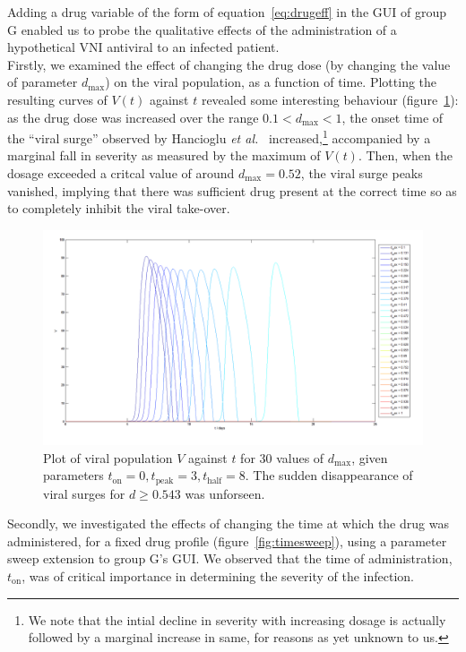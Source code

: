 \documentclass[a4paper, 12pt]{report}
\begin{document}
Adding a drug variable of the form of equation~\eqref{eq:drugeff}  in the GUI of group G enabled us to probe the qualitative effects of the administration of a hypothetical VNI antiviral to an infected patient.\\

Firstly, we examined the effect of changing the drug dose (by changing the value of parameter $d_{\textrm{max}}$) on the viral population, as a function of time. Plotting the resulting curves of $V(t)$ against $t$ revealed some interesting behaviour (figure~\ref{fig:dosesweep}): as the drug dose was increased over the range $0.1 < d_{\textrm{max}} < 1$, the onset time of the ``viral surge'' observed by Hancioglu \textit{et al.}~\cite{Hancioglu} increased,\footnote{We note that the intial decline in severity with increasing dosage is actually followed by a marginal increase in same, for reasons as yet unknown to us.} accompanied by a marginal fall in severity as measured by the maximum of $V(t)$. Then, when the dosage exceeded a critcal value of around  $d_{\textrm{max}} = 0.52$, the viral surge peaks vanished, implying that there was sufficient drug present at the correct time so as to completely inhibit the viral take-over.\\
\begin{figure}[h!]
\begin{centering}
\includegraphics[width = \textwidth]{dosesweep.png}
\caption{Plot of viral population $V$ against $t$ for 30 values of $d_{\textrm{max}}$, given parameters $t_{\textrm{on}} = 0, t_{\textrm{peak}} = 3, t_{\textrm{half}} = 8$. The sudden disappearance of viral surges for $d \geq 0.543$ was unforseen.}
\label{fig:dosesweep}
\end{centering}
\end{figure}

Secondly, we investigated the effects of changing the time at which the drug was administered, for a fixed drug profile (figure~\ref{fig:timesweep}), using a parameter sweep extension to group G's GUI. We observed that the time of administration, $t_{\textrm{on}}$, was of critical importance in determining the severity of the infection.
\end{document}
